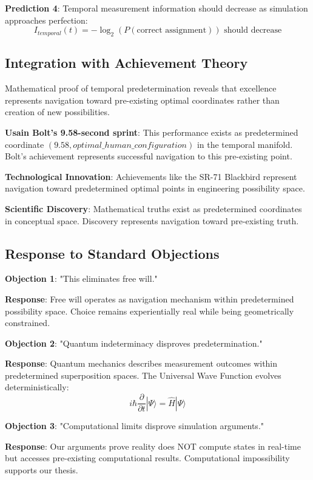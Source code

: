 \documentclass[11pt]{article}
\theoremstyle{remark}
\begin{document}
\textbf{Prediction 4}: Temporal measurement information should decrease as simulation approaches perfection:
$$I_{temporal}(t) = -\log_2(P(\text{correct assignment})) \text{ should decrease}$$

\subsection{Integration with Achievement Theory}

Mathematical proof of temporal predetermination reveals that excellence represents navigation toward pre-existing optimal coordinates rather than creation of new possibilities.

\textbf{Usain Bolt's 9.58-second sprint}: This performance exists as predetermined coordinate $(9.58, optimal\_human\_configuration)$ in the temporal manifold. Bolt's achievement represents successful navigation to this pre-existing point.

\textbf{Technological Innovation}: Achievements like the SR-71 Blackbird represent navigation toward predetermined optimal points in engineering possibility space.

\textbf{Scientific Discovery}: Mathematical truths exist as predetermined coordinates in conceptual space. Discovery represents navigation toward pre-existing truth.

\subsection{Response to Standard Objections}

\textbf{Objection 1}: "This eliminates free will."

\textbf{Response}: Free will operates as navigation mechanism within predetermined possibility space. Choice remains experientially real while being geometrically constrained.

\textbf{Objection 2}: "Quantum indeterminacy disproves predetermination."

\textbf{Response}: Quantum mechanics describes measurement outcomes within predetermined superposition spaces. The Universal Wave Function evolves deterministically:
$$i\hbar \frac{\partial}{\partial t}|\Psi\rangle = \hat{H}|\Psi\rangle$$

\textbf{Objection 3}: "Computational limits disprove simulation arguments."

\textbf{Response}: Our arguments prove reality does NOT compute states in real-time but accesses pre-existing computational results. Computational impossibility supports our thesis.
\end{document}
